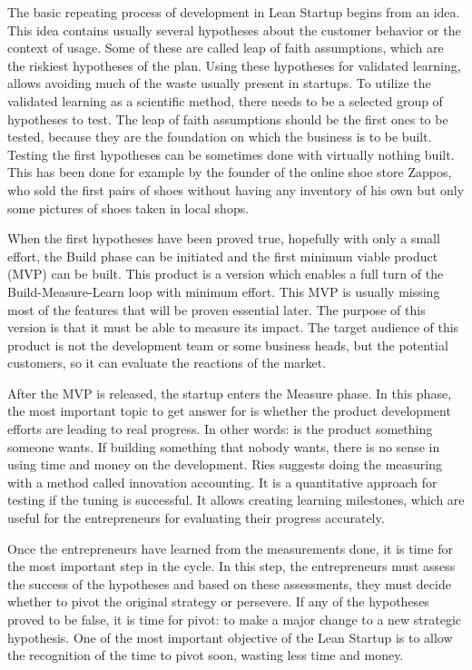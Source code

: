 The basic repeating process of development in Lean Startup begins from an idea. This idea contains usually several hypotheses about the customer behavior or the context of usage. Some of these are called leap of faith assumptions, which are the riskiest hypotheses of the plan. Using these hypotheses for validated learning, allows avoiding much of the waste usually present in startups. To utilize the validated learning as a scientific method, there needs to be a selected group of hypotheses to test. The leap of faith assumptions should be the first ones to be tested, because they are the foundation on which the business is to be built. Testing the first hypotheses can be sometimes done with virtually nothing built. This has been done for example by the founder of the online shoe store Zappos, who sold the first pairs of shoes without having any inventory of his own but only some pictures of shoes taken in local shops.~\cite{ries2011lean}

When the first hypotheses have been proved true, hopefully with only a small effort, the Build phase can be initiated and the first minimum viable product (MVP) can be built. This product is a version which enables a full turn of the Build-Measure-Learn loop with minimum effort. This MVP is usually missing most of the features that will be proven essential later. The purpose of this version is that it must be able to measure its impact. The target audience of this product is not the development team or some business heads, but the potential customers, so it can evaluate the reactions of the market.~\cite{ries2011lean}

After the MVP is released, the startup enters the Measure phase. In this phase, the most important topic to get answer for is whether the product development efforts are leading to real progress. In other words: is the product something someone wants. If building something that nobody wants, there is no sense in using time and money on the development. Ries suggests doing the measuring with a method called innovation accounting. It is a quantitative approach for testing if the tuning is successful. It allows creating learning milestones, which are useful for the entrepreneurs for evaluating their progress accurately.~\cite{ries2011lean}

Once the entrepreneurs have learned from the measurements done, it is time for the most important step in the cycle. In this step, the entrepreneurs must assess the success of the hypotheses and based on these assessments, they must decide whether to pivot the original strategy or persevere. If any of the hypotheses proved to be false, it is time for pivot: to make a major change to a new strategic hypothesis. One of the most important objective of the Lean Startup is to allow the recognition of the time to pivot soon, wasting less time and money.~\cite{ries2011lean}

